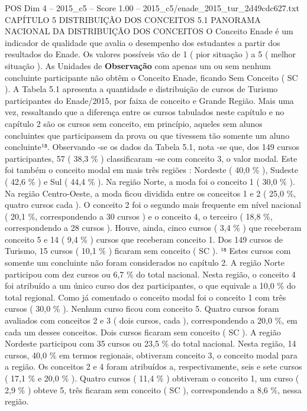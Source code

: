 \begin{textsample}{POS Dim 4 – 2015\_c5 – Score 1.00 – 2015\_c5/enade\_2015\_tur\_2d49cdc627.txt}  \label{ex:f4_pos_161}
CAPÍTULO 5 DISTRIBUIÇÃO DOS CONCEITOS 5.1 PANORAMA NACIONAL DA DISTRIBUIÇÃO DOS CONCEITOS O Conceito Enade é um indicador de qualidade que avalia o desempenho dos estudantes a partir dos resultados do Enade.
Os valores possíveis vão de 1 ( pior situação ) a 5 ( melhor situação ).
As Unidades de \textbf{Observação} com apenas um ou sem nenhum concluinte participante não obtêm o Conceito Enade, ficando Sem Conceito ( SC ).
A Tabela 5.1 apresenta a quantidade e distribuição de cursos de Turismo participantes do Enade/2015, por faixa de conceito e Grande Região.
Mais uma vez, ressaltando que a diferença entre os cursos tabulados neste capítulo e no capítulo 2 são os cursos sem conceito, em princípio, aqueles sem alunos concluintes que participassem da prova ou que tivessem tão somente um aluno concluinte¹⁸.
Observando -se os dados da Tabela 5.1, nota -se que, dos 149 cursos participantes, 57 ( 38,3 \% ) classificaram -se com conceito 3, o valor modal.
Este foi também o conceito modal em mais três regiões : Nordeste ( 40,0 \% ), Sudeste ( 42,6 \% ) e Sul ( 44,4 \% ).
Na região Norte, a moda foi o conceito 1 ( 30,0 \% ).
Na região Centro-Oeste, a moda ficou dividida entre os conceitos 1 e 2 ( 25,0 \%, quatro cursos cada ).
O conceito 2 foi o segundo mais frequente em nível nacional ( 20,1 \%, correspondendo a 30 cursos ) e o conceito 4, o terceiro ( 18,8 \%, correspondendo a 28 cursos ).
Houve, ainda, cinco cursos ( 3,4 \% ) que receberam conceito 5 e 14 ( 9,4 \% ) cursos que receberam conceito 1.
Dos 149 cursos de Turismo, 15 cursos ( 10,1 \% ) ficaram sem conceito ( SC ). ¹⁸ Estes cursos com somente um concluinte não foram considerados no capítulo 2.
A região Norte participou com dez cursos ou 6,7 \% do total nacional.
Nesta região, o conceito 4 foi atribuído a um único curso dos dez participantes, o que equivale a 10,0 \% do total regional.
Como já comentado o conceito modal foi o conceito 1 com três cursos ( 30,0 \% ).
Nenhum curso ficou com conceito 5.
Quatro cursos foram avaliados com conceitos 2 e 3 ( dois cursos, cada ), correspondendo a 20,0 \%, em cada um desses conceitos.
Dois cursos ficaram sem conceito ( SC ).
A região Nordeste participou com 35 cursos ou 23,5 \% do total nacional.
Nesta região, 14 cursos, 40,0 \% em termos regionais, obtiveram conceito 3, o conceito modal para a região.
Os conceitos 2 e 4 foram atribuídos a, respectivamente, seis e sete cursos ( 17,1 \% e 20,0 \% ).
Quatro cursos ( 11,4 \% ) obtiveram o conceito 1, um curso ( 2,9 \% ) obteve 5, três ficaram sem conceito ( SC ), correspondendo a 8,6 \%, nessa região.

\end{textsample}

